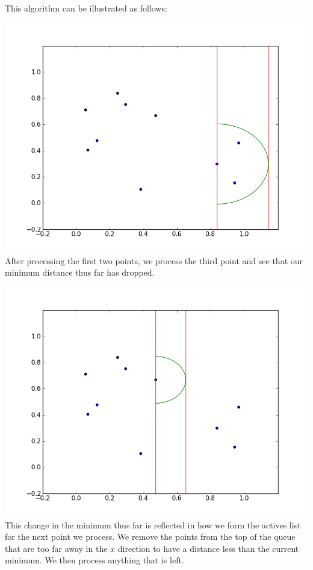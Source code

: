 This algorithm can be illustrated as follows:

\includegraphics[width = \textwidth]{simple1.png}
After processing the first two points, we process the third point and see that our minimum distance thus far has dropped.

\includegraphics[width = \textwidth]{simple2.png}
This change in the minimum thus far is reflected in how we form the actives list for the next point we process. 
We remove the points from the top of the queue that are too far away in the $x$ direction to have a distance less than the current minimum. 
We then process anything that is left.

